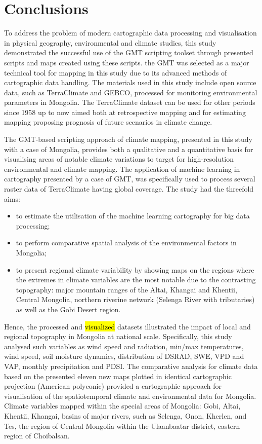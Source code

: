 \documentclass[geosciences,article,submit,pdftex,moreauthors]{Definitions/mdpi}
\begin{document}
\section{Conclusions}

To address the problem of modern cartographic data processing and visualisation in physical geography, environmental and climate studies, this study demonstrated the successful use of the GMT scripting toolset through presented scripts and maps created using these scripts. the GMT was selected as a major technical tool for mapping in this study due to its advanced methods of cartographic data handling. The materials used in this study include open source data, such as TerraClimate and GEBCO, processed for monitoring environmental parameters in Mongolia. The TerraClimate dataset can be used for other periods since 1958 up to now aimed both at retrospective mapping and for estimating mapping proposing prognosis of future scenarios in climate change. 

The GMT-based scripting approach of climate mapping, presented in this study with a case of Mongolia, provides both a qualitative and a quantitative basis for visualising areas of notable climate variations to target for high-resolution environmental and climate mapping. The application of machine learning in cartography presented by a case of GMT, was specifically used to process several raster data of TerraClimate having global coverage. The study had the threefold aims:     

\begin{itemize}
	\item	to estimate the utilisation of the machine learning cartography for big data processing;
	\item	to perform comparative spatial analysis of the environmental factors in Mongolia;
	\item	to present regional climate variability by showing maps on the regions where the extremes in climate variables are the most notable due to the contrasting topography: major mountain ranges of the Altai, Khangai and Khentii, Central Mongolia, northern riverine network (Selenga River with tributaries) as well as the Gobi Desert region.
\end{itemize}

Hence, the processed and \hl{visualized} datasets illustrated the impact of local and regional topography in Mongolia at national scale. Specifically, this study analysed such variables as wind speed and radiation,  min/max temperatures, wind speed, soil moisture dynamics, distribution of DSRAD, SWE, VPD and VAP, monthly precipitation and PDSI. The comparative analysis for climate data based on the presented eleven new maps plotted in identical cartographic projection (American polyconic)  provided a cartographic approach for visualisation of the spatiotemporal climate and environmental data for Mongolia. Climate variables mapped within the special areas of Mongolia: Gobi, Altai, Khentii, Khangai, basins of major rivers, such as Selenga, Onon, Kherlen, and Tes, the region of Central Mongolia within the Ulaanbaatar district, eastern region of Choibalsan.
\end{document}
